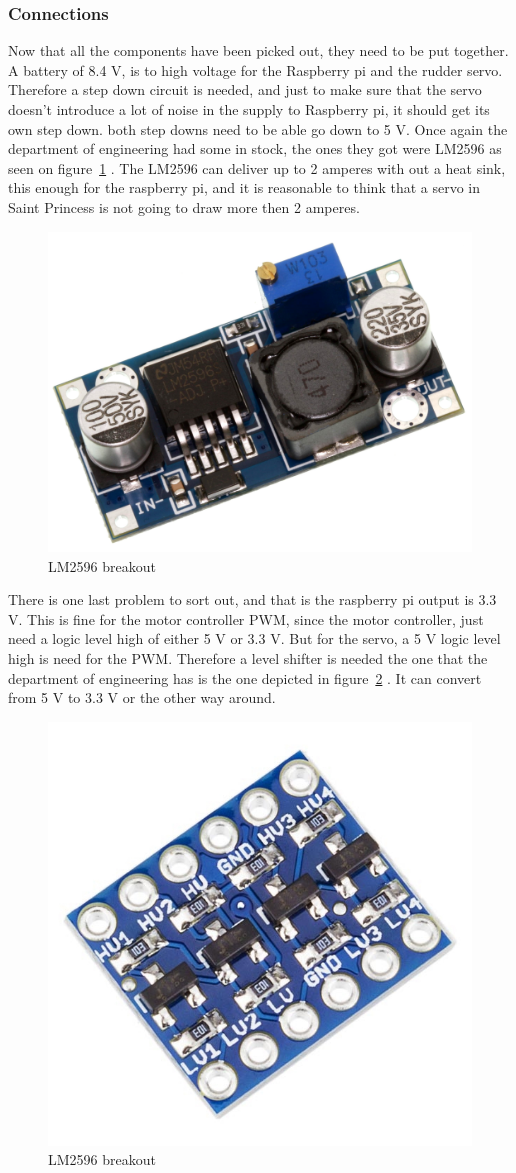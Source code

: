 \subsubsection{Connections}
Now that all the components have been picked out, they need to be put together. 
A battery of 8.4 V, is to high voltage for the Raspberry pi and the rudder servo. Therefore a step down circuit is needed, and just to make sure that the servo doesn't introduce a lot of noise in the supply to Raspberry pi, it should get its own step down. both step downs need to be able go down to 5 V. Once again the department of engineering had some in stock, the ones they got were LM2596 as seen on figure~\ref{fig:stepdown} \cite{stepdowm}. The LM2596 can deliver up to 2 amperes with out a heat sink, this enough for the raspberry pi, and it is reasonable to think that a servo in Saint Princess is not going to draw more then 2 amperes.
\begin{figure}[H]
\centering
\includegraphics[width=0.4\linewidth]{Images/Design/stepdown}
\caption{LM2596 breakout}
\label{fig:stepdown}
\end{figure}

There is one last problem to sort out, and that is the raspberry pi output is 3.3 V. This is fine for the motor controller PWM, since the motor controller, just need a logic level high of either 5 V or 3.3 V. But for the servo, a 5 V logic level high is need for the PWM. Therefore a level shifter is needed the one that the department of engineering has is the one depicted in figure~\ref{fig:levelshifter} \cite{levelshifter}. It can convert from 5 V to 3.3 V or the other way around. 

\begin{figure}[H]
\centering
\includegraphics[width=0.3\linewidth]{Images/Design/levelshifter}
\caption{LM2596 breakout}
\label{fig:levelshifter}
\end{figure}

